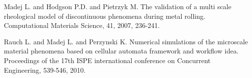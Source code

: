 
\begin{thebibliography}{10}

{\sc Madej L. and Hodgson P.D. and Pietrzyk M}. {The validation of a multi scale rheological model of discontinuous phenomena during metal rolling}. Computational Materials Science, 41, 2007, 236-241.



{\sc Rauch L. and Madej L. and Perzynski K}. {Numerical simulations of the microscale material phenomena based on cellular automata framework and workflow idea}. Proceedings of the 17th ISPE international conference on Concurrent Engineering, 539-546, 2010.

\end{thebibliography}
